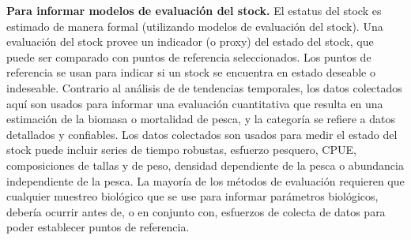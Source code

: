 \documentclass[
  11pt,
]{book}
\begin{document}
\begin{itemize}
\begin{itemize}
\begin{enumerate}
      \textbf{Para informar modelos de evaluación del stock.} El estatus del stock es estimado de manera formal (utilizando modelos de evaluación del stock). Una evaluación del stock provee un indicador (o proxy) del estado del stock, que puede ser comparado con puntos de referencia seleccionados. Los puntos de referencia se usan para indicar si un stock se encuentra en estado deseable o indeseable. Contrario al análisis de de tendencias temporales, los datos colectados aquí son usados para informar una evaluación cuantitativa que resulta en una estimación de la biomasa o mortalidad de pesca, y la categoría se refiere a datos detallados y confiables. Los datos colectados son usados para medir el estado del stock puede incluir series de tiempo robustas, esfuerzo pesquero, CPUE, composiciones de tallas y de peso, densidad dependiente de la pesca o abundancia independiente de la pesca. La mayoría de los métodos de evaluación requieren que cualquier muestreo biológico que se use para informar parámetros biológicos, debería ocurrir antes de, o en conjunto con, esfuerzos de colecta de datos para poder establecer puntos de referencia.
    \end{enumerate}
  \end{itemize}
\end{itemize}
\end{document}
